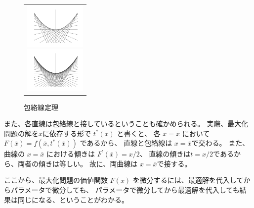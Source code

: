 \documentclass[11pt,a4j,fleqn]{jarticle}
\begin{document}
\begin{figure}[htbp]
  \begin{center}
    \begin{tabular}{c}

      \begin{minipage}{0.5\hsize}
        \begin{center}
          \includegraphics[bb=0 0 240 180 , width=3cm]{envelope1.png}
        \end{center}
      \end{minipage}

      \begin{minipage}{0.5\hsize}
        \begin{center}
          \includegraphics[bb=0 0 240 180 , width=3cm]{envelope0.png}
        \end{center}
      \end{minipage}

    \end{tabular}
    \caption{包絡線定理}
    \label{envelope}
  \end{center}
\end{figure}

また、各直線は包絡線と接しているということも確かめられる。
実際、最大化問題の解を$x$に依存する形で $t^*(x)$ と書くと、
各 $x = \bar{x}$ において $F(\bar{x}) = f(\bar{x} , t^*(\bar{x}))$ であるから、
直線と包絡線は $x = \bar{x}$で交わる。
また、曲線の $x = \bar{x}$ における傾きは $F^{'}(\bar{x}) = x/2$、
直線の傾きは$t = x/2$であるから、両者の傾きは等しい。
故に、両曲線は $x = \bar{x}$で接する。

\vspace{0.3cm}

ここから、最大化問題の価値関数 $F(x)$ を微分するには、最適解を代入してからパラメータで微分しても、
パラメータで微分してから最適解を代入しても結果は同じになる、ということがわかる。

\vspace{0.3cm}
\end{document}

